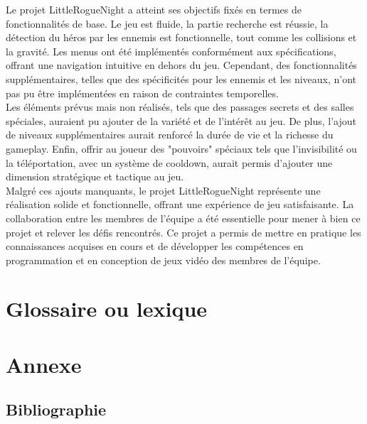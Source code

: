 \documentclass[10pt]{article}
\begin{document}
Le projet LittleRogueNight a atteint ses objectifs fixés en termes de fonctionnalités de base. Le jeu est fluide, la partie recherche est réussie, la détection du héros par les ennemis est fonctionnelle, tout comme les collisions et la gravité. Les menus ont été implémentés conformément aux spécifications, offrant une navigation intuitive en dehors du jeu. Cependant, des fonctionnalités supplémentaires, telles que des spécificités pour les ennemis et les niveaux, n'ont pas pu être implémentées en raison de contraintes temporelles.\\

Les éléments prévus mais non réalisés, tels que des passages secrets et des salles spéciales, auraient pu ajouter de la variété et de l'intérêt au jeu. De plus, l'ajout de niveaux supplémentaires aurait renforcé la durée de vie et la richesse du gameplay. Enfin, offrir au joueur des "pouvoirs" spéciaux tels que l'invisibilité ou la téléportation, avec un système de cooldown, aurait permis d'ajouter une dimension stratégique et tactique au jeu.\\

Malgré ces ajouts manquants, le projet LittleRogueNight représente une réalisation solide et fonctionnelle, offrant une expérience de jeu satisfaisante. La collaboration entre les membres de l'équipe a été essentielle pour mener à bien ce projet et relever les défis rencontrés. Ce projet a permis de mettre en pratique les connaissances acquises en cours et de développer les compétences en programmation et en conception de jeux vidéo des membres de l'équipe.\\
\clearpage

\section{Glossaire ou lexique}

\section{Annexe}
   \subsection{Bibliographie}
\end{document}
